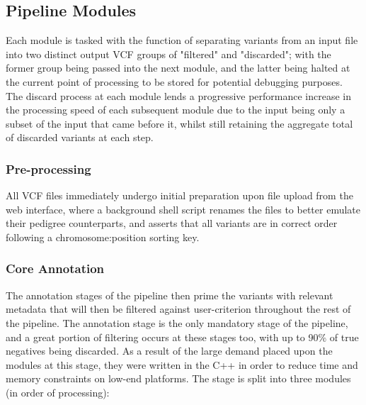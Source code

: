 
\subsection{Pipeline Modules}

Each module is tasked with the function of separating variants from an input file into two distinct output VCF groups of "filtered" and "discarded"; with the former group being passed into the next module, and the latter being halted at the current point of processing to be stored for potential debugging purposes. The discard process at each module lends a progressive performance increase in the processing speed of each subsequent module due to the input being only a subset of the input that came before it, whilst still retaining the aggregate total of discarded variants at each step.

\subsubsection{Pre-processing}

All VCF files immediately undergo initial preparation upon file upload from the web interface, where a background shell script renames the files to better emulate their pedigree counterparts, and asserts that all variants are in correct order following a chromosome:position sorting key.


\subsubsection{Core Annotation}

The annotation stages of the pipeline then prime the variants with relevant metadata that will then be filtered against user-criterion throughout the rest of the pipeline. The annotation stage is the only mandatory stage of the pipeline, and a great portion of filtering occurs at these stages too, with up to 90\% of true negatives being discarded. As a result of the large demand placed upon the modules at this stage, they were written in the C++ in order to reduce time and memory constraints on low-end platforms. The stage is split into three modules (in order of processing):\\


